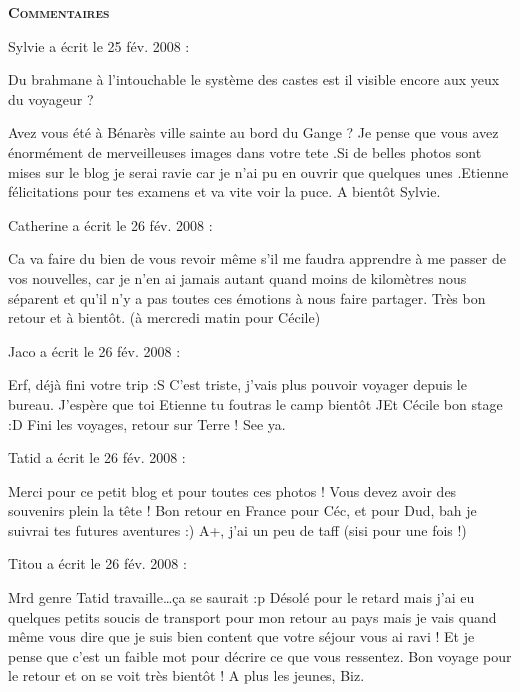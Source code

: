 \bigskip
\textbf{\textsc{Commentaires}}

\medskip
Sylvie a écrit le 25 fév. 2008 :
\begin{displayquote}
Du brahmane à l'intouchable le système des castes est il visible encore aux yeux du voyageur ?

Avez vous été à Bénarès ville sainte au bord du Gange ?	Je pense que vous avez énormément de merveilleuses images dans votre tete .Si de belles photos sont mises sur le blog je serai ravie car je n'ai pu en ouvrir que quelques unes .Etienne félicitations pour tes examens et va vite voir la puce. A bientôt Sylvie.
\end{displayquote}

\medskip
Catherine a écrit le 26 fév. 2008 :
\begin{displayquote}
Ca va faire du bien de vous revoir même s'il me faudra apprendre à me passer de vos nouvelles, car je n'en ai jamais autant quand moins de kilomètres nous séparent et qu'il n'y a pas toutes ces émotions à nous faire partager.
Très bon retour et à bientôt. (à mercredi matin pour Cécile)
\end{displayquote}

\medskip
Jaco a écrit le 26 fév. 2008 :
\begin{displayquote}
Erf, déjà fini votre trip :S C'est triste, j'vais plus pouvoir voyager depuis le bureau.
J'espère que toi Etienne tu foutras le camp bientôt ^^
Et Cécile bon stage :D Fini les voyages, retour sur Terre !
See ya.
\end{displayquote}

\medskip
Tatid a écrit le 26 fév. 2008 :
\begin{displayquote}
Merci pour ce petit blog et pour toutes ces photos ! Vous devez avoir des souvenirs plein la tête !
Bon retour en France pour Céc, et pour Dud, bah je suivrai tes futures aventures :)
A+, j'ai un peu de taff (sisi pour une fois !)
\end{displayquote}

\medskip
Titou a écrit le 26 fév. 2008 :
\begin{displayquote}
Mrd genre Tatid travaille\dots ça se saurait :p
Désolé pour le retard mais j'ai eu quelques petits soucis de transport pour mon retour au pays mais je vais quand même vous dire que je suis bien content que votre séjour vous ai ravi ! Et je pense que c'est un faible mot pour décrire ce que vous ressentez. Bon voyage pour le retour et on se voit très bientôt !
A plus les jeunes, Biz.
\end{displayquote}

